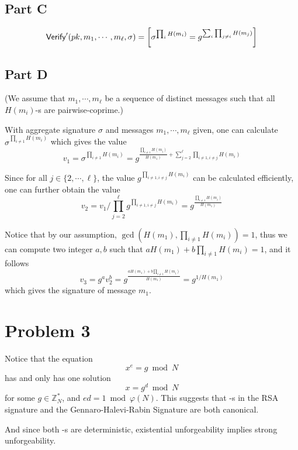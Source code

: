 \documentclass[8pt]{article}
\theoremstyle{compact}
\begin{document}
\subsection*{Part C}

$$\textsf{Verify}'(pk, m_1, \cdots, m_{\ell}, \sigma) = \left[\sigma^{\prod_{i}H(m_i)} = g^{\sum_i\prod_{j \neq i}H(m_j)}\right]$$

\subsection*{Part D}

(We assume that $m_1, \cdots, m_{\ell}$ be a sequence of distinct messages such that all $H(m_i)$-s are pairwise-coprime.)

With aggregate signature $\sigma$ and messages $m_1, \cdots, m_{\ell}$ given, one can calculate $\sigma^{\prod_{i \neq 1}H(m_i)}$ which gives the value $$v_1 = \sigma^{\prod_{i \neq 1}H(m_i)} = g^{\frac{\prod_{i \neq 1}H(m_i)}{H(m_1)} + \sum_{j=2}^{\ell}\prod_{i \neq 1, i \neq j}H(m_i)}$$

Since for all $j \in \{2, \cdots, \ell\}$, the value $g^{\prod_{i \neq 1, i \neq j}H(m_i)}$ can be calculated efficiently, one can further obtain the value $$v_2 = v_1 / \prod_{j=2}^{\ell}g^{\prod_{i \neq 1, i \neq j}H(m_i)} = g^{\frac{\prod_{i \neq 1}H(m_i)}{H(m_1)}}$$

Notice that by our assumption, $\gcd\left(H(m_1), \prod_{i \neq 1} H(m_i)\right) = 1$, thus we can compute two integer $a, b$ such that $aH(m_1) + b\prod_{i \neq 1} H(m_i) = 1$, and it follows $$v_3 = g^{a}v_2^{b} = g^{\frac{aH(m_1) + b\prod_{i \neq 1} H(m_i)}{H(m_1)}} = g^{1 / H(m_1)}$$ which gives the signature of message $m_1$.

\section*{Problem 3}
Notice that the equation $$x^e = g \bmod N$$ has and only has one solution $$x = g^d \bmod N$$ for some $g \in \mathbb Z_N^*$, and $ed = 1 \bmod \varphi(N)$. This suggests that \Verify-s in the RSA signature and the Gennaro-Halevi-Rabin Signature are both canonical.

And since both \Sign-s are deterministic, existential unforgeability implies strong unforgeability.
\end{document}
